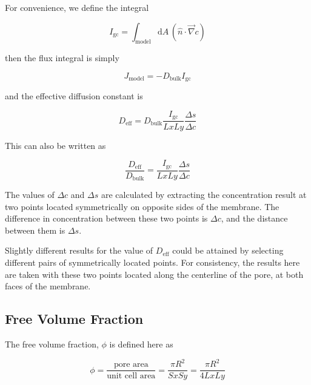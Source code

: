 For convenience, we define the integral

\begin{equation}
I_{\mathrm{gc}} = \int_{\mathrm{model}} \mathrm{d}A\, \left(\hat{n} \cdot \vec{\nabla} c \right)
\end{equation}

then the flux integral is simply

\begin{equation}
J_{\mathrm{model}} = - D_{\mathrm{bulk}} I_\mathrm{gc}
\end{equation}

and the effective diffusion constant is

\begin{equation}
D_{\mathrm{eff}} = D_{\mathrm{bulk}} \frac{I_\mathrm{gc}}{Lx Ly} \frac{\Delta s}{\Delta c}
\end{equation}

This can also be written as

\begin{equation}
\frac{D_{\mathrm{eff}}}{D_{\mathrm{bulk}}} = \frac{I_\mathrm{gc}}{Lx Ly} \frac{\Delta s}{\Delta c}
\end{equation}

The values of $\Delta c$ and $\Delta s$ are calculated by extracting
the concentration result at two points located symmetrically on opposite sides of the membrane.
The difference in concentration between these two points is $\Delta c$,
and the distance between them is $\Delta s$.

Slightly different results for the value of $D_{\mathrm{eff}}$ could be attained by selecting different
pairs of symmetrically located points.
For consistency, the results here are taken with these two points located
along the centerline of the pore, at both faces of the membrane.

\subsection{Free Volume Fraction}\label{subsec:volfrac}

The free volume fraction, $\phi$ is defined here as

\begin{equation}
\phi = \frac{\text{pore area}}{\text{unit cell area}}
= \frac{\pi R^2}{Sx Sy} = \frac{\pi R^2}{4 Lx Ly}
\end{equation}
